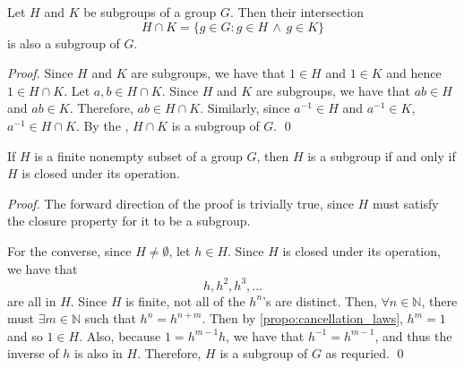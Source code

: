 \documentclass[notoc,notitlepage]{tufte-book}
\begin{document}
\begin{propo}\label{propo:intersection_of_subgroups_is_a_subgroup}
  Let $H$ and $K$ be subgroups of a group $G$. Then their intersection
  \begin{equation*}
    H \cap K = \{g \in G : g \in H \, \land \, g \in K\}
  \end{equation*}
  is also a subgroup of $G$.
\end{propo}

\begin{proof}
  Since $H$ and $K$ are subgroups, we have that $1 \in H$ and $1 \in K$ and hence $1 \in H \cap K$. Let $a, b \in H \cap K$. Since $H$ and $K$ are subgroups, we have that $ab \in H$ and $ab \in K$. Therefore, $ab \in H \cap K$. Similarly, since $a^{-1} \in H$ and $a^{-1} \in K$, $a^{-1} \in H \cap K$. By the , $H \cap K$ is a subgroup of $G$. \qed
\end{proof}

\begin{propo}\label{propo:finite_subgroup_test}
  If $H$ is a finite nonempty subset of a group $G$, then $H$ is a subgroup if and only if $H$ is closed under its operation.
\end{propo}

\begin{proof}
  The forward direction of the proof is trivially true, since $H$ must satisfy the closure property for it to be a subgroup.

  For the converse, since $H \neq \emptyset$, let $h \in H$. Since $H$ is closed under its operation, we have that
  \begin{equation*}
    h, h^2, h^3, ...
  \end{equation*}
  are all in $H$. Since $H$ is finite, not all of the $h^n$'s are distinct. Then, $\forall n \in \mathbb{N}$, there must $\exists m \in \mathbb{N}$ such that $h^n = h^{n + m}$. Then by \autoref{propo:cancellation_laws}, $h^m = 1$ and so $1 \in H$. Also, because $1 = h^{m - 1} h$, we have that $h^{-1} = h^{m - 1}$, and thus the inverse of $h$ is also in $H$. Therefore, $H$ is a subgroup of $G$ as requried. \qed
\end{proof}




\nobibliography*


\printindex
\end{document}
